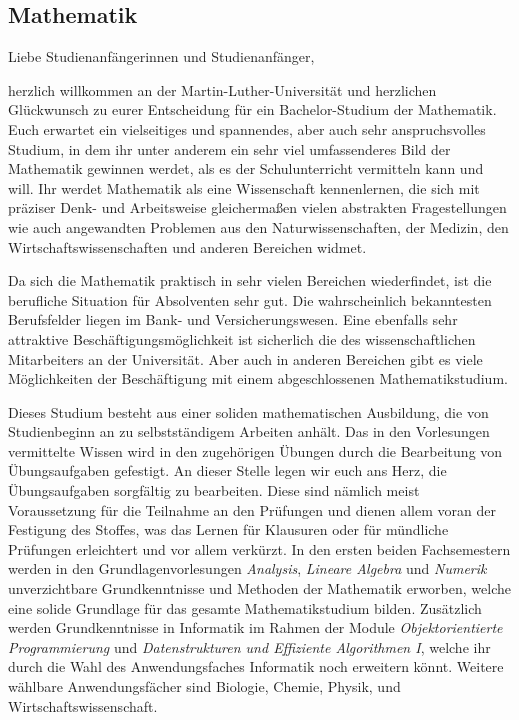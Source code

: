 \newpage

\subsection{Mathematik}
\label{studiengang_mathematik}

Liebe Studienanfängerinnen und Studienanfänger,\par

herzlich willkommen an der Martin-Luther-Universität und herzlichen Glückwunsch zu eurer Entscheidung für ein Bachelor-Studium der Mathematik.
Euch erwartet ein vielseitiges und spannendes, aber auch sehr anspruchsvolles Studium, in dem ihr unter anderem ein sehr viel umfassenderes Bild der Mathematik gewinnen werdet, als es der Schulunterricht vermitteln kann und will.
Ihr werdet Mathematik als eine Wissenschaft kennenlernen, die sich mit präziser Denk- und Arbeitsweise gleichermaßen vielen abstrakten Fragestellungen wie auch angewandten Problemen aus den Naturwissenschaften, der Medizin, den Wirtschaftswissenschaften und anderen Bereichen widmet.

Da sich die Mathematik praktisch in sehr vielen Bereichen wiederfindet, ist die berufliche Situation für Absolventen sehr gut.
Die wahrscheinlich bekanntesten Berufsfelder liegen im Bank- und Versicherungswesen.
Eine ebenfalls sehr attraktive Beschäftigungsmöglichkeit ist sicherlich die des wissenschaftlichen Mitarbeiters an der Universität.
Aber auch in anderen Bereichen gibt es viele Möglichkeiten der Beschäftigung mit einem abgeschlossenen Mathematikstudium.

Dieses Studium besteht aus einer soliden mathematischen Ausbildung, die von Studienbeginn an zu selbstständigem Arbeiten anhält. Das in den Vorlesungen vermittelte Wissen wird in den zugehörigen Übungen durch die Bearbeitung von Übungsauf\-gaben gefestigt.
An dieser Stelle legen wir euch ans Herz, die Übungsaufgaben sorgfältig zu bearbeiten. Diese sind nämlich meist Voraussetzung für die Teilnahme an den Prüfungen und dienen allem voran der Festigung des Stoffes, was das Lernen für Klausuren oder für mündliche Prüfungen erleichtert und vor allem verkürzt. 
In den ersten beiden Fachsemestern werden in den Grundlagenvorlesungen \textit{Analysis}, \textit{Lineare Algebra} und \textit{Numerik} unverzichtbare Grundkenntnisse und Methoden der Mathematik erworben, welche eine solide Grundlage für das gesamte Mathematikstudium bilden. Zusätzlich werden Grundkenntnisse in Informatik im Rahmen der Module \textit{Objektorientierte Programmierung} und \textit{Datenstrukturen und Effiziente Algorithmen I}, welche ihr durch die Wahl des Anwendungsfaches Informatik noch erweitern könnt. Weitere wählbare
Anwendungsfächer sind Biologie, Chemie, Physik, und Wirtschaftswissenschaft.


